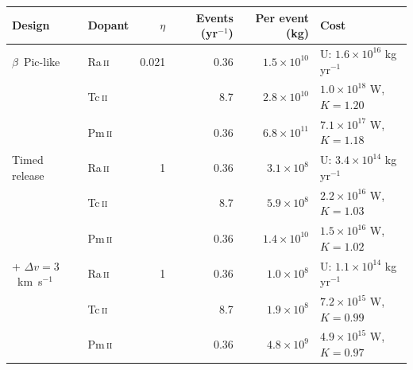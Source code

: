 \begin{tabular}{llrrrl}
\toprule
Design & Dopant & $\eta$ & Events (yr$^{-1}$) & Per event (kg) & Cost \\
\midrule
$\beta$~Pic-like & Ra\,\textsc{ii} & 0.021 & 0.36 & $1.5\times10^{10}$ & U: $1.6\times10^{16}$ kg yr$^{-1}$ \\
 & Tc\,\textsc{ii} &  & 8.7 & $2.8\times10^{10}$ & $1.0\times10^{18}$ W, $K = 1.20$ \\
 & Pm\,\textsc{ii} &  & 0.36 & $6.8\times10^{11}$ & $7.1\times10^{17}$ W, $K = 1.18$ \\
\addlinespace
Timed release & Ra\,\textsc{ii} & 1 & 0.36 & $3.1\times10^{8}$ & U: $3.4\times10^{14}$ kg yr$^{-1}$ \\
 & Tc\,\textsc{ii} &  & 8.7 & $5.9\times10^{8}$ & $2.2\times10^{16}$ W, $K = 1.03$ \\
 & Pm\,\textsc{ii} &  & 0.36 & $1.4\times10^{10}$ & $1.5\times10^{16}$ W, $K = 1.02$ \\
\addlinespace
+ $\Delta v = 3$~km~s$^{-1}$ & Ra\,\textsc{ii} & 1 & 0.36 & $1.0\times10^{8}$ & U: $1.1\times10^{14}$ kg yr$^{-1}$ \\
 & Tc\,\textsc{ii} &  & 8.7 & $1.9\times10^{8}$ & $7.2\times10^{15}$ W, $K = 0.99$ \\
 & Pm\,\textsc{ii} &  & 0.36 & $4.8\times10^{9}$ & $4.9\times10^{15}$ W, $K = 0.97$ \\
\bottomrule
\end{tabular}
